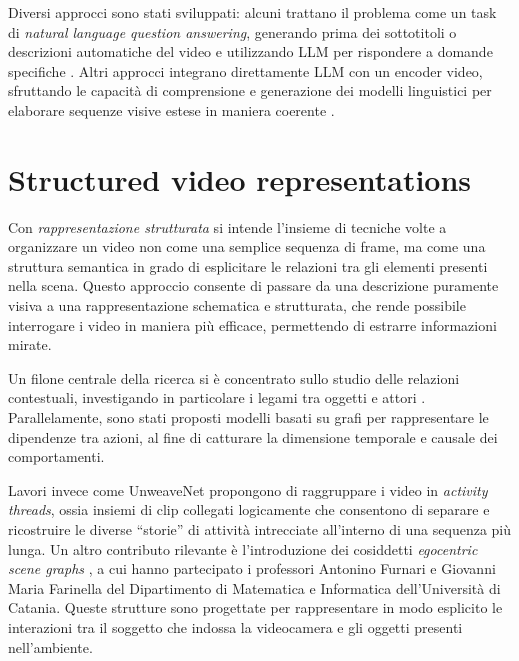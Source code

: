 Diversi approcci sono stati sviluppati: alcuni trattano il problema come un task di \emph{natural language question answering}, generando prima dei sottotitoli o descrizioni automatiche del video e utilizzando LLM per rispondere a domande specifiche \cite{ma2024drvideodocumentretrievalbased, park2025framesusefulefficientstrategies, wang2024videoagentlongformvideounderstanding, wang2024lifelongmemoryleveragingllmsanswering, wang2025videotreeadaptivetreebasedvideo, wu2022memvitmemoryaugmentedmultiscalevision}. Altri approcci integrano direttamente LLM con un encoder video, sfruttando le capacità di comprensione e generazione dei modelli linguistici per elaborare sequenze visive estese in maniera coerente \cite{li2024llmsmeetlongvideo, qian2024streaminglongvideounderstanding, ren2024timechattimesensitivemultimodallarge, song2024moviechatdensetokensparse}.

\section{Structured video representations}

Con \emph{rappresentazione strutturata} si intende l'insieme di tecniche volte a organizzare un video non come una semplice sequenza di frame, ma come una struttura semantica in grado di esplicitare le relazioni tra gli elementi presenti nella scena. Questo approccio consente di passare da una descrizione puramente visiva a una rappresentazione schematica e strutturata, che rende possibile interrogare i video in maniera più efficace, permettendo di estrarre informazioni mirate.

Un filone centrale della ricerca si è concentrato sullo studio delle relazioni contestuali, investigando in particolare i legami tra oggetti e attori \cite{arnab2021unifiedgraphstructuredmodels, baradel2018objectlevelvisualreasoning, cong2021spatialtemporaltransformerdynamicscene, jain2016structuralrnndeeplearningspatiotemporal, ji2019actiongenomeactionscomposition, ma2018attendinteracthigherorderobject, sun2018actorcentricrelationnetwork, wang2018videosspacetimeregiongraphs}. Parallelamente, sono stati proposti modelli basati su grafi per rappresentare le dipendenze tra azioni, al fine di catturare la dimensione temporale e causale dei comportamenti.

Lavori invece come UnweaveNet \cite{price2022unweavenetunweavingactivitystories} propongono di raggruppare i video in \emph{activity threads}, ossia insiemi di clip collegati logicamente che consentono di separare e ricostruire le diverse “storie” di attività intrecciate all'interno di una sequenza più lunga. Un altro contributo rilevante è l'introduzione dei cosiddetti \emph{egocentric scene graphs} \cite{rodin2023actionscenegraphslongform}, a cui hanno partecipato i professori Antonino Furnari e Giovanni Maria Farinella del Dipartimento di Matematica e Informatica dell'Università di Catania. Queste strutture sono progettate per rappresentare in modo esplicito le interazioni tra il soggetto che indossa la videocamera e gli oggetti presenti nell'ambiente.

